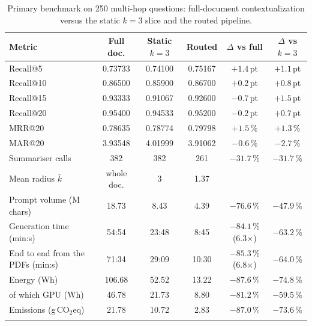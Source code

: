 \documentclass[pdflatex,sn-mathphys-num]{sn-jnl}
\makeatletter
\newcommand{\gco}{g\,CO$_2$eq}
\newcommand{\Rec}[1]{Recall@#1}
\newcommand{\MRR}[1]{MRR@#1}
\newcommand{\MAR}[1]{MAR@#1}
\theoremstyle{thmstyleone}%
\theoremstyle{thmstylethree}%
\makeatother
\begin{document}
\begin{table}[htbp]
\caption{Primary benchmark on 250 multi-hop questions: full-document contextualization versus the static $k=3$ slice and the routed pipeline.}\label{tab:primary}
\setlength{\tabcolsep}{4pt}
\begin{tabular}{@{}p{3.6cm}ccccc@{}}
\toprule
Metric & Full doc. & Static $k=3$ & Routed & $\Delta$ vs full & $\Delta$ vs $k=3$ \\
\midrule
\Rec{5} & 0.73733 & 0.74100 & 0.75167 & $+1.4$\,pt & $+1.1$\,pt \\
\Rec{10} & 0.86500 & 0.85900 & 0.86700 & $+0.2$\,pt & $+0.8$\,pt \\
\Rec{15} & 0.93333 & 0.91067 & 0.92600 & $-0.7$\,pt & $+1.5$\,pt \\
\Rec{20} & 0.95400 & 0.94533 & 0.95200 & $-0.2$\,pt & $+0.7$\,pt \\
\MRR{20} & 0.78635 & 0.78774 & 0.79798 & $+1.5$\,\% & $+1.3$\,\% \\
\MAR{20} & 3.93548 & 4.01999 & 3.91062 & $-0.6$\,\% & $-2.7$\,\% \\
Summariser calls & 382 & 382 & 261 & $-31.7$\,\% & $-31.7$\,\% \\
Mean radius $\bar k$ & whole doc. & 3 & 1.37 & & \\
Prompt volume (M chars) & 18.73 & 8.43 & 4.39 & $-76.6$\,\% & $-47.9$\,\% \\
Generation time (min:s) & 54:54 & 23:48\footnotemark[1] & 8:45 & $-84.1$\,\% (6.3$\times$) & $-63.2$\,\% \\
End to end from the PDFs (min:s) & 71:34\footnotemark[2] & 29:09\footnotemark[2] & 10:30\footnotemark[2] & $-85.3$\,\% (6.8$\times$) & $-64.0$\,\% \\
Energy (Wh) & 106.68 & 52.52\footnotemark[1] & 13.22 & $-87.6$\,\% & $-74.8$\,\% \\
\quad of which GPU (Wh) & 46.78 & 21.73\footnotemark[1] & 8.80 & $-81.2$\,\% & $-59.5$\,\% \\
Emissions (\gco{}) & 21.78 & 10.72\footnotemark[1] & 2.83 & $-87.0$\,\% & $-73.6$\,\% \\
\botrule
\end{tabular}
\end{table}
\end{document}
